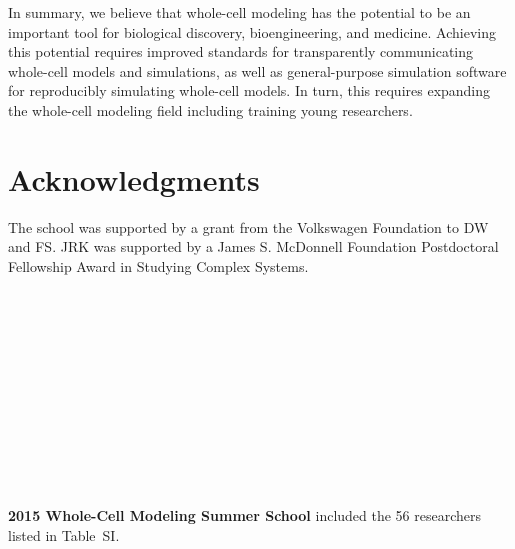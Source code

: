 \documentclass[journal,transmag]{IEEEtran}
\begin{document}
In summary, we believe that whole-cell modeling has the potential to be an important tool for biological discovery, bioengineering, and medicine. Achieving this potential requires improved standards for transparently communicating whole-cell models and simulations, as well as general-purpose simulation software for reproducibly simulating whole-cell models. In turn, this requires expanding the whole-cell modeling field including training young researchers.

\section*{Acknowledgments}
The school was supported by a grant from the Volkswagen Foundation to DW and FS. JRK was supported by a James S. McDonnell Foundation Postdoctoral Fellowship Award in Studying Complex Systems.

\ifCLASSOPTIONcaptionsoff
  \newpage
\fi




% 

\begin{IEEEbiography}{}
~\\
~\\
~\\
~\\
~\\
~\\
~\\
~\\
~\\
~\\
~\\
\textbf{2015 Whole-Cell Modeling Summer School} included the 56 researchers listed in Table~SI.
\end{IEEEbiography}
\end{document}
